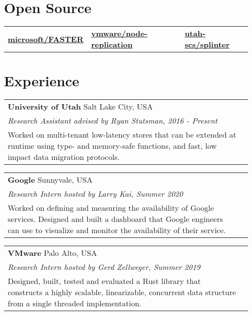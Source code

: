 \documentclass[margin,line]{res}
\begin{document}
\begin{resume}
\section{\sc Open Source}
\begin{tabular}{@{}p{2in}p{2in}p{2in}}
\href{{https://github.com/microsoft/FASTER}}{{\bf microsoft/FASTER}}
&
%
\href{{https://github.com/vmware/node-replication}}{{\bf vmware/node-replication}}
&
%
\href{{https://github.com/utah-scs/splinter}}
{{\bf utah-scs/splinter}}
\end{tabular}

\section{\sc Experience}
\begin{tabular}{@{}p{5.5in}p{4in}}
{\bf University of Utah} \dotfill Salt Lake City, USA\\
{\small\em Research Assistant advised by Ryan Stutsman, 2016 - Present}\\
{\small Worked on multi-tenant low-latency stores that can
be extended at runtime using type- and memory-safe functions,
and fast,
low impact data migration protocols.}
\end{tabular}

\vspace{-7pt}
\begin{tabular}{@{}p{5.5in}p{4in}}
{\bf Google} \dotfill Sunnyvale, USA \\
{\small\em Research Intern hosted by Larry Kai, Summer 2020}\\
{\small Worked on defining and measuring the availability of Google
services. Designed and built a dashboard that Google engineers
can use to visualize and monitor the availability of their service.}
\end{tabular}

\vspace{-7pt}
\begin{tabular}{@{}p{5.5in}p{4in}}
{\bf VMware} \dotfill Palo Alto, USA \\
{\small\em Research Intern hosted by Gerd Zellweger, Summer 2019}\\
{\small
Designed,
built, tested and evaluated a Rust library that constructs a highly scalable, linearizable,
concurrent data
structure from a single threaded implementation.}
\end{tabular}


\end{resume}
\end{document}
